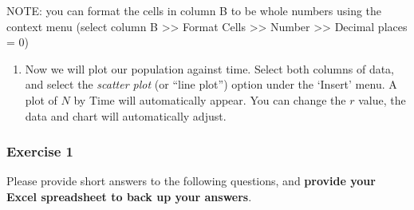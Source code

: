 \documentclass[
]{article}
\providecommand{\tightlist}{%
  \setlength{\itemsep}{0pt}\setlength{\parskip}{0pt}}
\begin{document}
NOTE: you can format the cells in column B to be whole numbers using the
context menu (select column B \textgreater\textgreater{} Format Cells
\textgreater\textgreater{} Number \textgreater\textgreater{} Decimal
places = 0)

\begin{enumerate}
\def\labelenumi{\arabic{enumi}.}
\setcounter{enumi}{6}
\tightlist
\item
  Now we will plot our population against time. Select both columns of
  data, and select the \emph{scatter plot} (or ``line plot'') option
  under the `Insert' menu. A plot of \(N\) by Time will automatically
  appear. You can change the \(r\) value, the data and chart will
  automatically adjust.
\end{enumerate}

\hypertarget{exercise-1}{%
\subsubsection{Exercise 1}\label{exercise-1}}

Please provide short answers to the following questions, and
\textbf{provide your Excel spreadsheet to back up your answers}.
\end{document}
